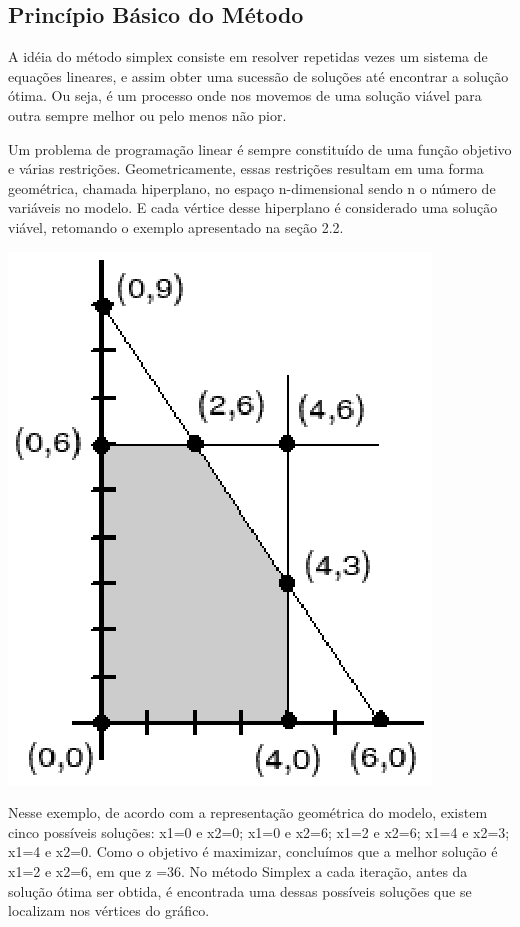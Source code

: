 \subsection{Princípio Básico do Método}
A idéia do método simplex consiste em resolver repetidas vezes um sistema de equações lineares, e assim obter uma sucessão de soluções até encontrar a solução ótima. Ou seja, é um processo onde nos movemos de uma solução viável para outra sempre melhor ou pelo menos não pior.

Um problema de programação linear é sempre constituído de uma função objetivo e várias restrições. Geometricamente, essas restrições resultam em uma forma geométrica, chamada hiperplano, no espaço n-dimensional sendo n o número de variáveis no modelo. E cada vértice desse hiperplano é considerado uma solução viável, retomando o exemplo apresentado na seção 2.2.
\begin{center}
	\includegraphics[scale=0.5]{graficos/graf_simplex_pontos}
	\label{img:simplex_grafico_completo}
\end{center}

Nesse exemplo, de acordo com a representação geométrica do modelo, existem cinco possíveis soluções: x1=0 e  x2=0; x1=0 e  x2=6; x1=2 e  x2=6; x1=4 e  x2=3; x1=4 e x2=0. Como o objetivo é maximizar, concluímos que a melhor solução é x1=2 e  x2=6, em que z =36. No método Simplex a cada iteração, antes da solução ótima ser obtida, é encontrada uma dessas possíveis soluções que se localizam nos vértices do gráfico.

